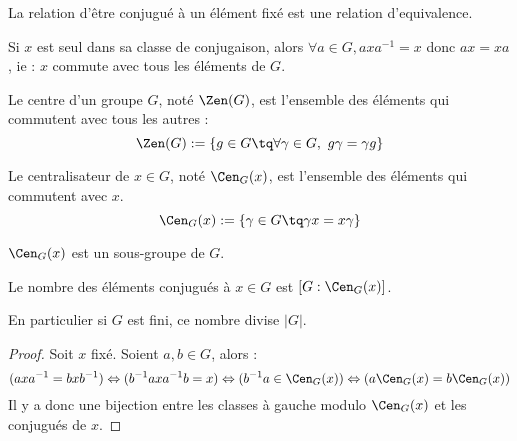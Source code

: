 \begin{prop}

 La relation d'être conjugué à un élément fixé est une relation d'equivalence.
\end{prop}

\begin{example}[Remarque]
Si $x$ est seul dans sa classe de conjugaison, alors $\forall a \in G, axa^{-1}
= x$ donc $ax = xa$, ie : $x$ commute avec tous les éléments de $G$.
\end{example}

\begin{defi}
 
Le centre d'un groupe $G$, noté $\Zen(G)$, est l'ensemble des éléments qui
commutent avec tous les autres :
\begin{displaymath} \Zen(G) := \{g\in G \tq \forall \gamma \in G,\ g\gamma =
\gamma g\} \end{displaymath}
\end{defi}

\begin{defi}
 
Le centralisateur de $x \in G$, noté $\Cen_G(x)$, est l'ensemble des éléments
qui commutent avec $x$.
\begin{displaymath} \Cen_G(x) := \{\gamma \in G \tq \gamma x = x \gamma \}
\end{displaymath}
\end{defi}

\begin{prop}
 
$\Cen_G(x)$ est un sous-groupe de $G$.
\end{prop}

\begin{theo}

 Le nombre des éléments conjugués à $x\in G$ est $[G:\Cen_G(x)]$.

En particulier si $G$ est fini, ce nombre divise $|G|$.
\end{theo}

\begin{proof}
Soit $x$ fixé. Soient $a,b \in G$, alors :
\begin{displaymath}
 (axa^{-1} = bxb^{-1})
\Leftrightarrow (b^{-1}axa^{-1}b = x) \Leftrightarrow (b^{-1}a \in
\Cen_G(x)) \Leftrightarrow (a\Cen_G(x) = b\Cen_G(x))
\end{displaymath}
Il y a donc une
bijection entre les classes à gauche modulo $\Cen_G(x)$ et les conjugués de $x$.
\end{proof}

